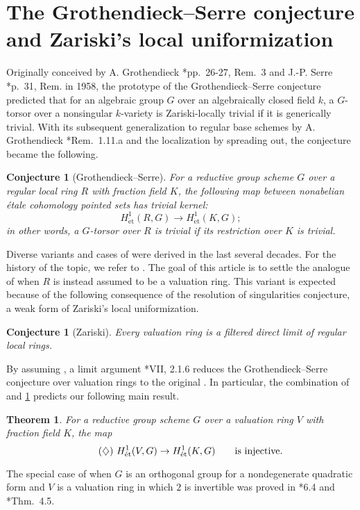 \documentclass[a4paper,11pt,reqno]{amsart}
\newcommand{\ra}{\rightarrow}
\newcommand{\et}{\mathrm{\acute{e}t}}	                                           %
\providecommand{\ucolon}{{\upshape:}}
\newcommand{\bthm}{\begin{thm}}
\newcommand{\ethm}{\end{thm}}
\newcommand{\bconj}{\begin{conj}}
\newcommand{\econj}{\end{conj}}
\newcommand{\qq}{\quad\quad}
\theoremstyle{plain}
\newtheorem{thm}[numberingbase]{Theorem}
\newtheorem{conj}[numberingbase]{Conjecture}
\theoremstyle{remark}
\theoremstyle{definition}
\theoremstyle{plain}
\theoremstyle{definition}
\theoremstyle{subsection-tweak}
\theoremstyle{subsection-tweak}
\numberwithin{equation}{subsection}
\begin{document}
      \section{The Grothendieck--Serre conjecture and Zariski's local uniformization}
      Originally conceived by  A. Grothendieck \cite{Gro58}*{pp.~26-27, Rem.~3} and J.-P. Serre \cite{Ser58}*{p.~31, Rem.} in 1958, the prototype of the Grothendieck--Serre conjecture predicted that for an algebraic group $G$ over an algebraically closed field $k$, a $G$-torsor over a nonsingular $k$-variety is Zariski-locally trivial if it is generically trivial.
      With its subsequent generalization to regular base schemes by A. Grothendieck \cite{Gro68}*{Rem.~1.11.a} and the localization by spreading out, the conjecture became the following.
      \bconj[Grothendieck--Serre]\label{GSconj}
      For a reductive group scheme $G$ over a regular local ring $R$ with fraction field $K$, the following map between nonabelian \'etale cohomology pointed sets has trivial kernel\ucolon
      \[
      H^1_{\et}(R,G)\ra H^1_{\et}(K,G);
      \]
      in other words, a $G$-torsor over $R$ is trivial if its restriction over $K$ is trivial.
      \econj
      Diverse variants and cases of  were derived in the last several decades.
      For the history of the topic, we refer to \cites{Guo19, FP15}.
      The goal of this article is to settle the analogue of  when $R$ is instead assumed to be a valuation ring.
      This variant is expected because of the following consequence of the resolution of singularities conjecture, a weak form of Zariski's local uniformization.
      \bconj[Zariski]\label{local-unif}
      Every valuation ring is a filtered direct limit of regular local rings.
      \econj
      By assuming , a limit argument \cite{Gir71}*{VII, 2.1.6} reduces the Grothendieck--Serre conjecture over valuation rings to the original .
      In particular, the combination of  and \ref{local-unif} predicts our following main result.
      \bthm\label{GSVal}
      For a reductive group scheme $G$ over a valuation ring $V$ with fraction field $K$, the map
      \[
      \text{\tag{$\diamondsuit$}  $H^1_{\et}(V,G)\ra H^1_{\et}(K,G) \label{GSV}$\qq  is injective.}
      \]
      \ethm
      The special case of  when $G$ is an orthogonal group for a nondegenerate quadratic form and $V$ is a valuation ring in which $2$ is invertible was proved in \cite{CTS87}*{6.4} and \cite{CLRR80}*{Thm.~4.5}. 

      
\end{document}
